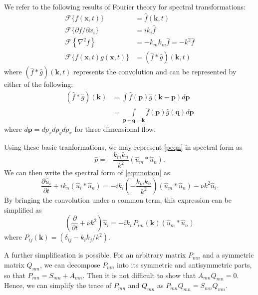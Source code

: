 \documentclass[letterpaper, 11pt, onecolumn, oneside]{article}
\newcommand{\pdiff}[2]{\frac{\partial #1}{\partial #2}}
\begin{document}
We refer to the following results of Fourier theory for spectral transformations:
\begin{subequations}
\begin{align}
	\mathcal{F} \{ f(\bm{x}, t) \} & = \hat{f}(\bm{k}, t) \\
	\mathcal{F} \{ \partial f / \partial x_i \} & = i k_i \hat{f} \\
	\mathcal{F} \left\{ \nabla^2 f \right\} & = -k_m k_m \hat{f} = -k^2 \hat{f} \\
	\mathcal{F} \{ f(\bm{x},t) g(\bm{x},t) \} & = (\hat{f} * \hat{g})(\bm{k},t)
\end{align}
\end{subequations}
where $(\hat{f} * \hat{g})(\bm{k},t)$ represents the convolution and can be represented by either of the following:
\begin{equation*}
\begin{split}
	(\hat{f} * \hat{g})(\bm{k}) & = \int \hat{f}(\bm{p}) \hat{g}(\bm{k} - \bm{p}) d\bm{p} \\
	& = \int\limits_{\bm{p} + \bm{q} = \bm{k}} \hat{f}(\bm{p}) \hat{g}(\bm{q}) d\bm{p}
\end{split}
\end{equation*}
where $d\bm{p} = dp_x dp_y dp_x$ for three dimensional flow.

Using these basic tranformations, we may represent \eqref{peqn} in spectral form as
\begin{equation}\label{pspect}
	\hat{p} = -\frac{k_m k_n}{k^2} (\hat{u}_m * \hat{u}_n).
\end{equation}
We can then write the spectral form of \eqref{eqnmotion} as
\begin{equation}
	\pdiff{\hat{u}_i}{t} + ik_n (\hat{u}_i * \hat{u}_n) = -i k_i \left(-\frac{k_m k_n}{k^2}\right) (\hat{u}_m * \hat{u}_n) - \nu k^2 \hat{u}_i.
\end{equation}
By bringing the convolution under a common term, this expression can be simplified as
\begin{equation}
	\left(\pdiff{}{t} + \nu k^2 \right) \hat{u}_i = -i k_n P_{im}(\bm{k}) (\hat{u}_m * \hat{u}_n)
\end{equation}
where $P_{ij}(\bm{k}) = (\delta_{ij} - k_i k_j / k^2)$.

A further simplification is possible. For an arbitrary matrix $P_{mn}$ and a symmetric matrix $Q_{mn}$, we can decompose $P_{mn}$ into its symmetric and antisymmetric parts, so that $P_{mn} = S_{mn} + A_{mn}$. Then it is not difficult to show that $A_{mn} Q_{mn} = 0$. Hence, we can simplify the trace of $P_{mn}$ and $Q_{mn}$ as $P_{mn} Q_{mn} = S_{mn} Q_{mn}$.
\end{document}

